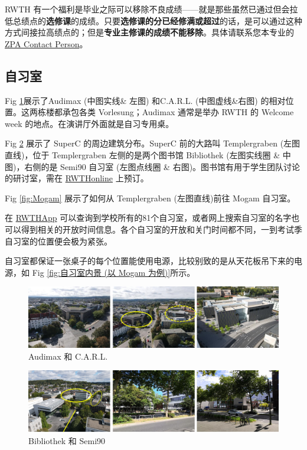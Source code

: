     RWTH 有一个福利是毕业之际可以移除不良成绩——就是那些虽然已通过但会拉低总绩点的\textbf{选修课}的成绩。只要\textbf{选修课的分已经修满或超过}的话，是可以通过这种方式间接拉高绩点的；但是\textbf{专业主修课的成绩不能移除}。具体请联系您本专业的 \href{https://www.rwth-aachen.de/go/id/cbcn/lidx/1}{ZPA Contact Person}。

  \subsection{自习室}\label{subsec:自习室}

    Fig \ref{fig:Audimax 和 C.A.R.L.}展示了Audimax (中图实线\& 左图) 和C.A.R.L. (中图虚线\&右图) 的相对位置。这两栋楼都承包各类 Vorlesung；Audimax 通常是举办 RWTH 的 Welcome week 的地点。在演讲厅外面就是自习专用桌。

    Fig \ref{fig:Bibliothek 和 Semi90} 展示了 SuperC 的周边建筑分布。SuperC 前的大路叫 Templergraben (左图直线)，位于 Templergraben 左侧的是两个图书馆 Bibliothek (左图实线圈 \& 中图)，右侧的是 Semi90 自习室 (左图点线圈 \& 右图)。图书馆有用于学生团队讨论的研讨室，需在 \href{https://online.rwth-aachen.de/}{RWTHonline} 上预订。

    Fig \ref{fig:Mogam} 展示了如何从 Templergraben (左图直线)前往 Mogam 自习室。

    在 \href{https://play.google.com/store/apps/details?id=de.rwth_aachen.rz.rwthapp&hl=en}{RWTHApp} 可以查询到学校所有的81个自习室，或者网上搜索自习室的名字也可以得到相关的开放时间信息。各个自习室的开放和关门时间都不同，一到考试季自习室的位置便会极为紧张。

    自习室都保证一张桌子的每个位置能使用电源，比较别致的是从天花板吊下来的电源，如 Fig \ref{fig:自习室内景 (以 Mogam 为例)}所示。

    \begin{figure}[H]
      \centering
      \includegraphics[width=\textwidth]{在亚琛学习和生活/Study/Audimax 和 C.A.R.L..png}
      \caption{Audimax 和 C.A.R.L.}
      \label{fig:Audimax 和 C.A.R.L.}
    \end{figure}

    \begin{figure}[H]
      \centering
      \includegraphics[width=\textwidth]{在亚琛学习和生活/Study/Bibliothek 和 Semi90.png}
      \caption{Bibliothek 和 Semi90}
      \label{fig:Bibliothek 和 Semi90}
    \end{figure}

